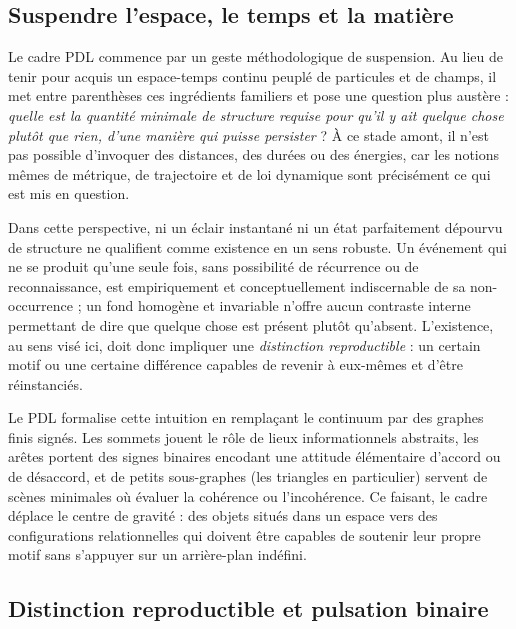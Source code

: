 \documentclass[11pt,a4paper]{article}
\theoremstyle{definition}
\begin{document}
\subsection{Suspendre l'espace, le temps et la matière}

Le cadre PDL commence par un geste méthodologique de suspension. Au lieu de tenir pour acquis un espace-temps continu peuplé de particules et de champs, il met entre parenthèses ces ingrédients familiers et pose une question plus austère : \emph{quelle est la quantité minimale de structure requise pour qu’il y ait quelque chose plutôt que rien, d’une manière qui puisse persister} ?\cite{Laubscher_IntroPDL_2024,Laubscher_EmergencePhysicalReality_2024,Laubscher_Existence_PulsatingClosure_2026} À ce stade amont, il n’est pas possible d’invoquer des distances, des durées ou des énergies, car les notions mêmes de métrique, de trajectoire et de loi dynamique sont précisément ce qui est mis en question.

Dans cette perspective, ni un éclair instantané ni un état parfaitement dépourvu de structure ne qualifient comme existence en un sens robuste. Un événement qui ne se produit qu’une seule fois, sans possibilité de récurrence ou de reconnaissance, est empiriquement et conceptuellement indiscernable de sa non-occurrence ; un fond homogène et invariable n’offre aucun contraste interne permettant de dire que quelque chose est présent plutôt qu’absent.\cite{Laubscher_Existence_PulsatingClosure_2026} L’existence, au sens visé ici, doit donc impliquer une \emph{distinction reproductible} : un certain motif ou une certaine différence capables de revenir à eux-mêmes et d’être réinstanciés.

Le PDL formalise cette intuition en remplaçant le continuum par des graphes finis signés. Les sommets jouent le rôle de lieux informationnels abstraits, les arêtes portent des signes binaires encodant une attitude élémentaire d’accord ou de désaccord, et de petits sous-graphes (les triangles en particulier) servent de scènes minimales où évaluer la cohérence ou l’incohérence.\cite{Laubscher_EmergencePhysicalReality_2024,Laubscher_PDL_Position_2024} Ce faisant, le cadre déplace le centre de gravité : des objets situés dans un espace vers des configurations relationnelles qui doivent être capables de soutenir leur propre motif sans s’appuyer sur un arrière-plan indéfini.

\subsection{Distinction reproductible et pulsation binaire}
\end{document}
